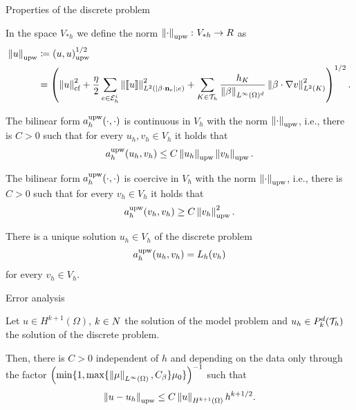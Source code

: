 	\begin{frame}[allowframebreaks]{Properties of the discrete problem}
	\begin{definicion}
		In the space $V_{*h}$ we define the norm $\left\|\cdot\right\|_{\text{upw}}\colon V_{*h}\to\relax R$ as {\footnotesize 
		\begin{align*}
		\left\|u\right\|_{\text{upw}}&\coloneqq\left(u,u\right)_\text{upw}^{1/2}\\&= \left(\left\|u\right\|_{\text{cf}}^2+\frac{\eta}{2}\sum_{e\in\mathcal{E}_h^i}\left\|\left[\!\left[u\right]\!\right]\right\|^2_{L^2(|\beta\cdot\mathbf{n}_e|;e)} + \sum_{K\in\mathcal{T}_h}\frac{h_K}{\left\|\beta\right\|_{L^\infty(\Omega)^d}}\left\|\beta\cdot\nabla v\right\|_{L^2(K)}^2 \right)^{1/2}.
		\end{align*}}
	\end{definicion}
	\framebreak
	\begin{lemma}
		The bilinear form $a_h^{\text{upw}}(\cdot,\cdot)$ is continuous in $V_h$ with the norm $\left\|\cdot\right\|_{\text{upw}}$, i.e., there is $C>0$ such that for every $u_h,v_h\in V_h$ it holds that $$a_h^{\text{upw}}(u_h,v_h)\leq C\left\|u_h\right\|_{\text{upw}}\left\|v_h\right\|_{\text{upw}}.$$
	\end{lemma}
	
	\begin{proposition}
		The bilinear form $a_h^{\text{upw}}(\cdot,\cdot)$ is coercive in $V_h$ with the norm $\left\|\cdot\right\|_{\text{upw}}$, i.e., there is $C>0$ such that for every $v_h\in V_h$ it holds that $$a_h^{\text{upw}}(v_h,v_h)\geq C\left\|v_h\right\|_{\text{upw}}^2.$$
	\end{proposition}
	\framebreak
	\begin{lemma}
		There is a unique solution $u_h\in V_h$ of the discrete problem $$a_h^{\text{upw}}(u_h,v_h)=L_h(v_h)$$ for every $v_h\in V_h$.
	\end{lemma}
	\end{frame}
	
	\begin{frame}{Error analysis}
	\begin{theorem}
		Let $u\in H^{k+1}(\Omega)$, $k\in\relax N$ the solution of the model problem and $u_h\in \relax{P}_k^d(\mathcal{T}_h)$ the solution of the discrete problem.
		
		Then, there is $C>0$ independent of $h$ and depending on the data only through the factor  $\left(\min\{1,\max\{\left\|\mu\right\|_{L^\infty(\Omega)},C_\beta\}\mu_0\}\right)^{-1}$ such that $$\left\|u-u_h\right\|_{\text{upw}}\leq C\left\|u\right\|_{H^{k+1}(\Omega)}h^{k+1/2}.$$
	\end{theorem}
\end{frame}

